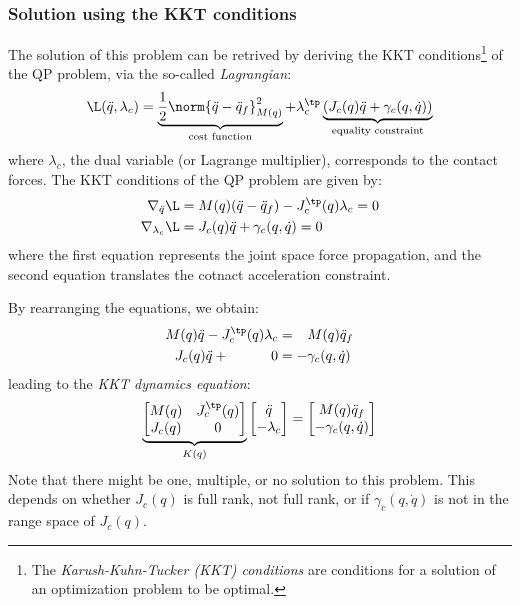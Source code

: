 \subsubsection{Solution using the KKT conditions}
The solution of this problem can be retrived by deriving the KKT conditions\footnote{The \emph{Karush-Kuhn-Tucker (KKT) conditions} are conditions for a solution of an optimization problem to be optimal.} of the QP problem, via the so-called \emph{Lagrangian}:
\begin{equation*}
    \L(\ddot{q}, \lambda_c) = 
    \underbrace{
        \frac{1}{2}\norm{\ddot{q}-\ddot{q}_f}^2_{M(q)}
     }_{\text{cost function}} + 
     \lambda_c^\tp
     \underbrace{
        \left(J_c(q)\ddot{q} + \gamma_c(q, \dot{q})\right)
     }_{\text{equality constraint}}
\end{equation*}
where $\lambda_c$, the dual variable (or Lagrange multiplier), corresponds to the contact forces. The KKT conditions of the QP problem are given by:
\begin{align}
    \nabla_{\ddot{q}}\L &= M(q)(\ddot{q}-\ddot{q}_f) - J_c^\tp(q)\lambda_c = 0 \\
    \nabla_{\lambda_c}\L &= J_c(q)\ddot{q} + \gamma_c(q, \dot{q}) = 0
\end{align}
where the first equation represents the joint space force propagation, and the second equation translates the cotnact acceleration constraint.

By rearranging the equations, we obtain:
\begin{align*}
    M(q)\ddot{q} - J_c^\tp(q)\lambda_c &= \phantom{-}M(q)\ddot{q}_f\\
    J_c(q)\ddot{q} + \qquad\quad0 &= -\gamma_c(q, \dot{q})
\end{align*}
leading to the \emph{KKT dynamics equation}:
\begin{equation}
    \underbrace{\begin{bmatrix}
        M(q) & J_c^\tp(q) \\
        J_c(q) & 0
    \end{bmatrix}}_{K(q)}
    \begin{bmatrix}
        \ddot{q} \\
        -\lambda_c
    \end{bmatrix} =
    \begin{bmatrix}
        M(q)\ddot{q}_f \\
        -\gamma_c(q, \dot{q})
    \end{bmatrix}
\end{equation}
Note that there might be one, multiple, or no solution to this problem. This depends on whether $J_c(q)$ is full rank, not full rank, or if $\gamma_c(q, \dot{q})$ is not in the range space of $J_c(q)$.


